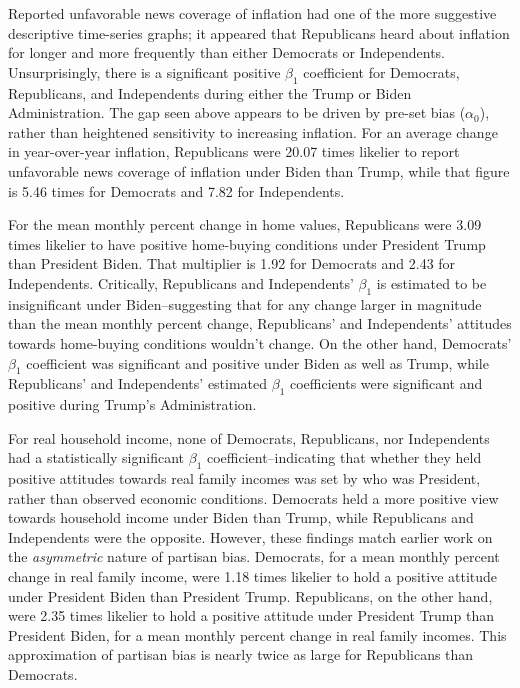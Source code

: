 \documentclass{article}
\begin{document}
Reported unfavorable news coverage of inflation had one of the more suggestive descriptive time-series graphs; it appeared that Republicans heard about inflation for longer and more frequently than either Democrats or Independents. Unsurprisingly, there is a significant positive $\beta_1$ coefficient for Democrats, Republicans, and Independents during either the Trump or Biden Administration. The gap seen above appears to be driven by pre-set bias ($\alpha_0$), rather than heightened sensitivity to increasing inflation. For an average change in year-over-year inflation, Republicans were 20.07 times likelier to report unfavorable news coverage of inflation under Biden than Trump, while that figure is 5.46 times for Democrats and 7.82 for Independents.

For the mean monthly percent change in home values, Republicans were 3.09 times likelier to have positive home-buying conditions under President Trump than President Biden. That multiplier is 1.92 for Democrats and 2.43 for Independents. Critically, Republicans and Independents' $\beta_1$ is estimated to be insignificant under Biden--suggesting that for any change larger in magnitude than the mean monthly percent change, Republicans' and Independents' attitudes towards home-buying conditions wouldn't change. On the other hand, Democrats' $\beta_1$ coefficient was significant and positive under Biden as well as Trump, while Republicans' and Independents' estimated $\beta_1$ coefficients were significant and positive during Trump's Administration.

For real household income, none of Democrats, Republicans, nor Independents had a statistically significant $\beta_1$ coefficient--indicating that whether they held positive attitudes towards real family incomes was set by who was President, rather than observed economic conditions. Democrats held a more positive view towards household income under Biden than Trump, while Republicans and Independents were the opposite. However, these findings match earlier work on the \textit{asymmetric} nature of partisan bias. Democrats, for a mean monthly percent change in real family income, were 1.18 times likelier to hold a positive attitude under President Biden than President Trump. Republicans, on the other hand, were 2.35 times likelier to hold a positive attitude under President Trump than President Biden, for a mean monthly percent change in real family incomes. This approximation of partisan bias is nearly twice as large for Republicans than Democrats. 
\end{document}
